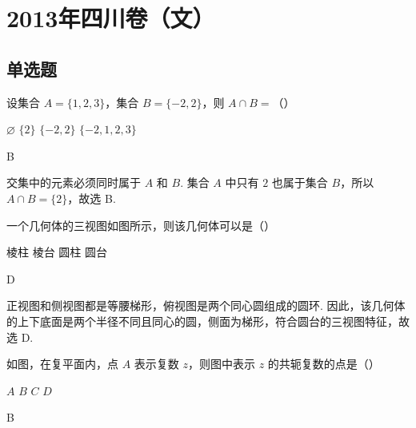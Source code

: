 \chapter{2013年四川卷（文）}

\section{单选题}

\begin{problem}
设集合 \(A = \{1, 2, 3\}\)，集合 \(B = \{-2, 2\}\)，则 \(A \cap B =\)（\quad）

\choices
    {\(\varnothing\)}
    {\(\{2\}\)}
    {\(\{-2, 2\}\)}
    {\(\{-2, 1, 2, 3\}\)}
\end{problem}

\begin{answer}
B
\end{answer}

\begin{solution}
交集中的元素必须同时属于 \(A\) 和 \(B\). 集合 \(A\) 中只有 \(2\) 也属于集合 \(B\)，所以 \(A\cap B=\{2\}\)，故选 B.
\end{solution}

\begin{problem}
一个几何体的三视图如图所示，则该几何体可以是（\quad）


\choices
    {棱柱}
    {棱台}
    {圆柱}
    {圆台}
\end{problem}

\begin{answer}
D
\end{answer}

\begin{solution}
正视图和侧视图都是等腰梯形，俯视图是两个同心圆组成的圆环. 因此，该几何体的上下底面是两个半径不同且同心的圆，侧面为梯形，符合圆台的三视图特征，故选 D.
\end{solution}

\begin{problem}
如图，在复平面内，点 \(A\) 表示复数 \(z\)，则图中表示 \(z\) 的共轭复数的点是（\quad）


\choices
    {\(A\)}
    {\(B\)}
    {\(C\)}
    {\(D\)}
\end{problem}

\begin{answer}
B
\end{answer}

